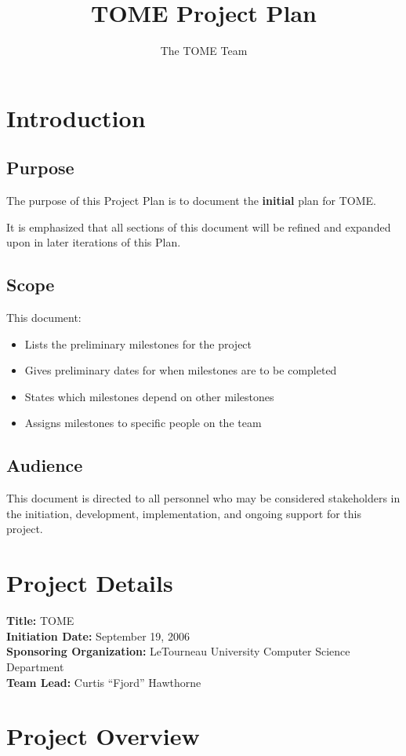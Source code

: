 \documentclass[12pt,titlepage]{article}
\author{The TOME Team}
\title{\textbf{TOME Project Plan}}
\begin{document}
\maketitle
\tableofcontents
\newpage
\section{Introduction}
\subsection{Purpose}
The purpose of this Project Plan is to document the \textbf{initial} plan for TOME.

It is emphasized that all sections of this document will be refined and expanded upon in later iterations of this Plan.

\subsection{Scope}
This document:
\begin{itemize}
	\item Lists the preliminary milestones for the project
	\item Gives preliminary dates for when milestones are to be completed
	\item States which milestones depend on other milestones
        \item Assigns milestones to specific people on the team
\end{itemize}
\subsection{Audience}
This document is directed to all personnel who may be considered stakeholders in the initiation, development, implementation, and ongoing support for this project.
\section{Project Details}
\textbf{Title:} TOME\\
\textbf{Initiation Date:} September 19, 2006\\
\textbf{Sponsoring Organization:} LeTourneau University Computer Science Department\\
\textbf{Team Lead:} Curtis ``Fjord'' Hawthorne
\section{Project Overview}
\end{document}
